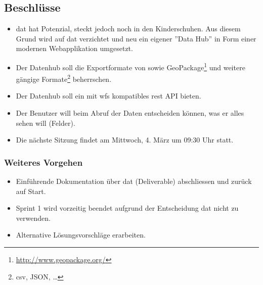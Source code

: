 \documentclass[class=scrbook,crop=false]{standalone}
\begin{document}
	\subsection*{Beschlüsse}
	\begin{itemize}
		\item \gls{dat} hat Potenzial, steckt jedoch noch in den Kinderschuhen. Aus diesem Grund wird auf \gls{dat} verzichtet und neu ein eigener ''Data Hub'' in Form einer modernen Webapplikation umgesetzt.
		\item Der Datenhub soll die Exportformate von  sowie GeoPackage\footnote{\url{http://www.geopackage.org/}} und weitere gängige Formate\footnote{\acs{csv}, JSON, \dots} beherrschen.
		\item Der Datenhub soll ein mit \gls{wfs} kompatibles \acs{rest} API bieten.
		\item Der Benutzer will beim Abruf der Daten entscheiden können, was er alles sehen will (Felder).
		\item Die nächste Sitzung findet am Mittwoch, 4. März um 09:30 Uhr statt.
	\end{itemize}
	
	\subsubsection*{Weiteres Vorgehen}
	\begin{itemize}
		\item Einführende Dokumentation über \gls{dat} (Deliverable) abschliessen und zurück auf Start.
		\item Sprint 1 wird vorzeitig beendet aufgrund der Entscheidung \gls{dat} nicht zu verwenden.
		\item Alternative Lösungsvorschläge erarbeiten.
	\end{itemize}
	
\end{document}
